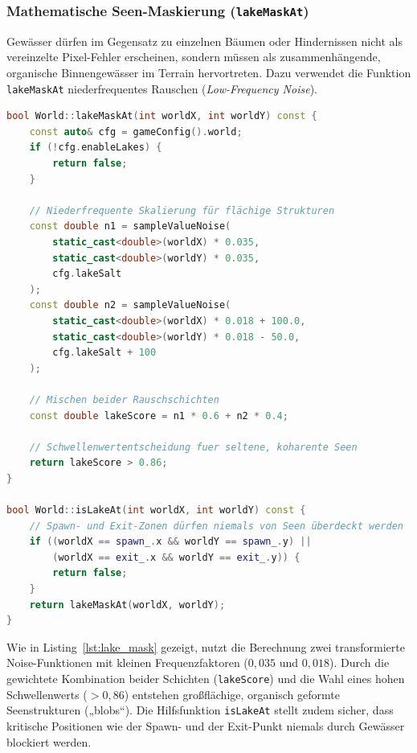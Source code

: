 \documentclass[
  a4paper,
  11pt,
  twoside,
  BCOR=8mm,           %
  headings=big,
  numbers=noenddot,
  listof=totoc,       %
  captions=tableheading,
]{scrreprt}
\begin{document}
\subsubsection{Mathematische Seen-Maskierung (\texttt{lakeMaskAt})}
Gewässer dürfen im Gegensatz zu einzelnen Bäumen oder Hindernissen nicht als vereinzelte Pixel-Fehler erscheinen, sondern müssen als zusammenhängende, organische Binnengewässer im Terrain hervortreten. Dazu verwendet die Funktion \texttt{lakeMaskAt} niederfrequentes Rauschen (\textit{Low-Frequency Noise}).

\begin{lstlisting}[language=C++, caption={Low-Frequency-Value-Noise für zusammenhängende Gewässermasken in \texttt{world.cpp}}, label={lst:lake_mask}]
bool World::lakeMaskAt(int worldX, int worldY) const {
    const auto& cfg = gameConfig().world;
    if (!cfg.enableLakes) {
        return false;
    }

    // Niederfrequente Skalierung für flächige Strukturen
    const double n1 = sampleValueNoise(
        static_cast<double>(worldX) * 0.035, 
        static_cast<double>(worldY) * 0.035, 
        cfg.lakeSalt
    );
    const double n2 = sampleValueNoise(
        static_cast<double>(worldX) * 0.018 + 100.0, 
        static_cast<double>(worldY) * 0.018 - 50.0, 
        cfg.lakeSalt + 100
    );

    // Mischen beider Rauschschichten
    const double lakeScore = n1 * 0.6 + n2 * 0.4;

    // Schwellenwertentscheidung fuer seltene, koharente Seen
    return lakeScore > 0.86;
}

bool World::isLakeAt(int worldX, int worldY) const {
    // Spawn- und Exit-Zonen dürfen niemals von Seen überdeckt werden
    if ((worldX == spawn_.x && worldY == spawn_.y) || 
        (worldX == exit_.x && worldY == exit_.y)) {
        return false;
    }
    return lakeMaskAt(worldX, worldY);
}
\end{lstlisting}

Wie in Listing~\ref{lst:lake_mask} gezeigt, nutzt die Berechnung zwei transformierte Noise-Funktionen mit kleinen Frequenzfaktoren ($0{,}035$ und $0{,}018$). Durch die gewichtete Kombination beider Schichten (\texttt{lakeScore}) und die Wahl eines hohen Schwellenwerts ($> 0{,}86$) entstehen großflächige, organisch geformte Seenstrukturen („blobs“). Die Hilfsfunktion \texttt{isLakeAt} stellt zudem sicher, dass kritische Positionen wie der Spawn- und der Exit-Punkt niemals durch Gewässer blockiert werden.
\end{document}
